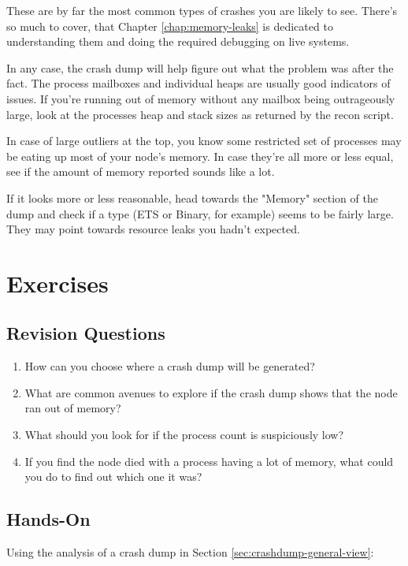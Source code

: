 \documentclass[11pt, oneside]{book}   	%
\begin{document}
These are by far the most common types of crashes you are likely to see. There's so much to cover, that Chapter \ref{chap:memory-leaks} is dedicated to understanding them and doing the required debugging on live systems.

In any case, the crash dump will help figure out what the problem was after the fact. The process mailboxes and individual heaps are usually good indicators of issues. If you're running out of memory without any mailbox being outrageously large, look at the processes heap and stack sizes as returned by the recon script.

In case of large outliers at the top, you know some restricted set of processes may be eating up most of your node's memory. In case they're all more or less equal, see if the amount of memory reported sounds like a lot.

If it looks more or less reasonable, head towards the "Memory" section of the dump and check if a type (ETS or Binary, for example) seems to be fairly large. They may point towards resource leaks you hadn't expected.


\section{Exercises}

\subsection{Revision Questions}

\begin{enumerate}
	\item How can you choose where a crash dump will be generated?
	\item What are common avenues to explore if the crash dump shows that the node ran out of memory?
	\item What should you look for if the process count is suspiciously low?
	\item If you find the node died with a process having a lot of memory, what could you do to find out which one it was?\end{enumerate}

\subsection{Hands-On}

Using the analysis of a crash dump in Section \ref{sec:crashdump-general-view}:
\end{document}

